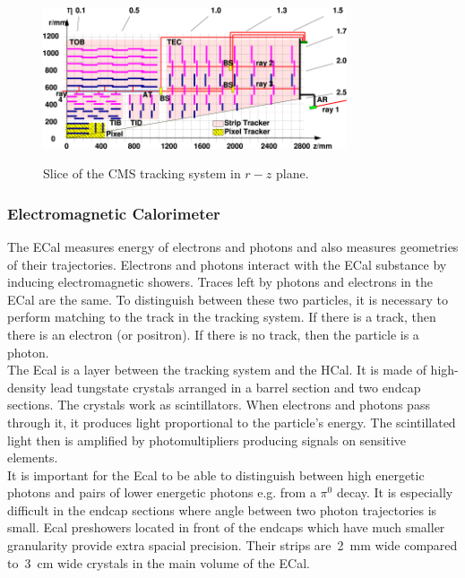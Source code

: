 

\begin{figure}[htb]
  \begin{center}
    {\includegraphics[width=0.8\textwidth]{../figs/Exp/tracker_slice.png}}
    \caption{Slice of the CMS tracking system in $r-z$ plane.}
    \label{fig:tracker_slice}
  \end{center}
\end{figure}

\subsubsection{Electromagnetic Calorimeter}

The ECal measures energy of electrons and photons and also measures geometries of their trajectories. Electrons and photons interact with the ECal substance by inducing electromagnetic showers. Traces left by photons and electrons in the ECal are the same. To distinguish between these two particles, it is necessary to perform matching to the track in the tracking system. If there is a track, then there is an electron (or positron). If there is no track, then the particle is a photon.\\

The Ecal is a layer between the tracking system and the HCal. It is made of high-density lead tungstate crystals arranged in a barrel section and two endcap sections. The crystals work as scintillators. When electrons and photons pass through it, it produces light proportional to the particle's energy. The scintillated light then is amplified by photomultipliers producing signals on sensitive elements.\\

It is important for the Ecal to be able to distinguish between high energetic photons and pairs of lower energetic photons e.g. from a $\pi^0$ decay. It is especially difficult in the endcap sections where angle between two photon trajectories is small. Ecal preshowers located in front of the endcaps which have much smaller granularity provide extra spacial precision. Their strips are~2~mm wide compared to~3~cm wide crystals in the main volume of the ECal.\\

